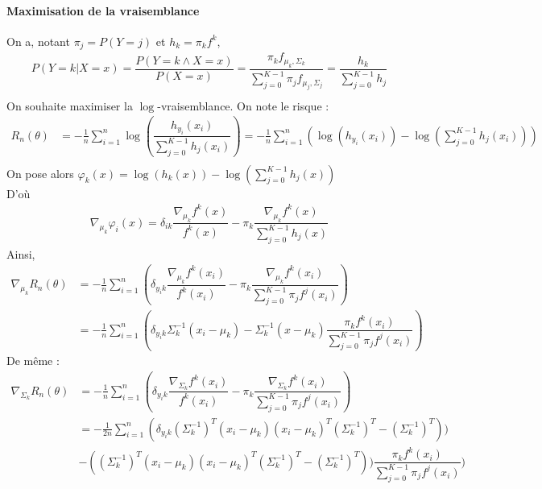 \documentclass[paper=a4, fontsize=11pt]{article}
\begin{document}
\paragraph{Maximisation de la vraisemblance}
On a, notant $\pi_j = P(Y=j)$ et $h_k = \pi_k f^{k}$, 
\begin{align*}
P(Y=k|X=x) = \dfrac{P(Y=k \wedge X=x)}{P(X=x)} = \dfrac{\pi_k  f_{\mu_k,\Sigma_k} }{\sum\limits_{j=0}^{K-1}\pi_j f_{\mu_j,\Sigma_j}} = 
\dfrac{h_k}{\sum\limits_{j=0}^{K-1} h_j}\\
\end{align*}
On souhaite maximiser la $\log$-vraisemblance. On note le risque :
\begin{align*}
R_n(\theta) &= -\frac{1}{n}\sum\limits_{i=1}^{n} \log(\dfrac{h_{y_i}(x_i)}{\sum\limits_{j=0}^{K-1} h_j(x_i)}) =  -\frac{1}{n}\sum\limits_{i=1}^{n} (\log(h_{y_i}(x_i)) - \log(\sum\limits_{j=0}^{K-1} h_j(x_i)))\\
\end{align*}
On pose alors $\varphi_k(x) = \log(h_k(x)) - \log(\sum\limits_{j=0}^{K-1} h_j(x))$\\
D'où 
\begin{align*}
\nabla_{\mu_k}\varphi_i(x) = \delta_{ik}\dfrac{\nabla_{\mu_k}f^{k}(x)}{f^{k}(x)} - \pi_k\dfrac{\nabla_{\mu_k}f^{k}(x)}{\sum\limits_{j=0}^{K-1} h_j(x)}
\end{align*}
Ainsi, 
\begin{align*}
\nabla_{\mu_k}R_n(\theta) &= -\frac{1}{n}\sum\limits_{i=1}^{n} (\delta_{y_{i}k}\dfrac{\nabla_{\mu_k}f^{k}(x_i)}{f^{k}(x_i)} - \pi_k\dfrac{\nabla_{\mu_k}f^{k}(x_i)}{\sum\limits_{j=0}^{K-1} \pi_j f^{j}(x_i)}) \\
&= -\frac{1}{n}\sum\limits_{i=1}^{n}(\delta_{y_{i}k}\Sigma_{k}^{-1}(x_i-\mu_k) - \Sigma_{k}^{-1}(x-\mu_k)\dfrac{\pi_kf^{k}(x_i)}{\sum\limits_{j=0}^{K-1} \pi_j f^{j}(x_i)})
\end{align*}
De même :
\begin{align*}
\nabla_{\Sigma_k}R_n(\theta) &= -\frac{1}{n}\sum\limits_{i=1}^{n} (\delta_{y_{i}k}\dfrac{\nabla_{\Sigma_k}f^{k}(x_i)}{f^{k}(x_i)} - \pi_k\dfrac{\nabla_{\Sigma_k}f^{k}(x_i)}{\sum\limits_{j=0}^{K-1} \pi_j f^{j}(x_i)}) \\
&=-\frac{1}{2n}\sum\limits_{i=1}^{n}(\delta_{y_ik}(\Sigma_k^{-1})^{T}(x_i-\mu_k)(x_i-\mu_k)^{T}(\Sigma_k^{-1})^{T} - (\Sigma_k^{-1})^{T})) \\&- ((\Sigma_k^{-1})^{T}(x_i-\mu_k)(x_i-\mu_k)^{T}(\Sigma_k^{-1})^{T} - (\Sigma_k^{-1})^{T}))\dfrac{\pi_kf^{k}(x_i)}{\sum\limits_{j=0}^{K-1} \pi_j f^{j}(x_i)})
\end{align*}
\end{document}
